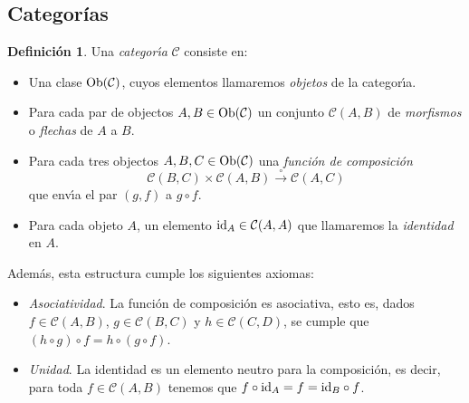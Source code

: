 \documentclass[11pt,a4paper,openright,oneside]{article}
\numberwithin{equation}{section}
\theoremstyle{definition}
\newtheorem{defi}[teo]{Definici\'on}
\begin{document}
\subsection{Categor\'ias}
\begin{defi}
    Una \emph{categor\'{\i}a} $\mathcal{C}$ consiste en:
    \begin{itemize}
        \item Una clase ${\rm Ob}(\mathcal{C})$, cuyos elementos llamaremos \emph{objetos} de la categor\'{\i}a.
        \item Para cada par de objectos $A, B\in{\rm Ob}(\mathcal{C})$ un conjunto $\mathcal{C}(A,B)$ de \emph{morfismos} o \emph{flechas} de $A$ a $B$.
        \item Para cada tres objectos $A, B, C\in{\rm Ob}(\mathcal{C})$ una \emph{funci\'on de composici\'on}
              $$
                  \mathcal{C}(B,C)\times \mathcal{C}(A,B)\stackrel{\circ}{\longrightarrow} \mathcal{C}(A,C)
              $$
              que env\'{\i}a el par $(g,f)$ a $g\circ f$.
        \item Para cada objeto $A$, un elemento ${\rm id}_A\in\mathcal{C}(A,A)$ que llamaremos la \emph{identidad} en $A$.
    \end{itemize}
    Adem\'as, esta estructura cumple los siguientes axiomas:
    \begin{itemize}
        \item \emph{Asociatividad}. La funci\'on de composici\'on es asociativa, esto es, dados $f\in\mathcal{C}(A,B)$, $g\in\mathcal{C}(B,C)$ y $h\in\mathcal{C}(C,D)$, se cumple que $(h\circ g)\circ f=h\circ(g\circ f)$.
        \item \emph{Unidad}. La identidad es un elemento neutro para la composici\'on, es decir, para toda $f\in\mathcal{C}(A,B)$ tenemos que $f\circ {\rm id}_A=f={\rm id}_B\circ f$.
    \end{itemize}
\end{defi}
\end{document}
